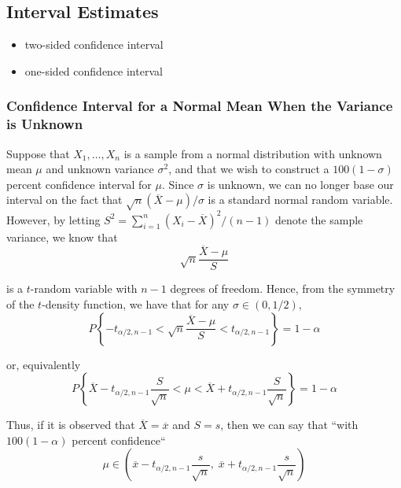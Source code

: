 \documentclass[12pt]{article}
\begin{document}
\subsection{Interval Estimates}

\begin{itemize}
  \item two-sided confidence interval
  \item one-sided confidence interval
\end{itemize}

\subsubsection{Confidence Interval for a Normal Mean When the Variance is Unknown}

Suppose that $X_1, \dots, X_n$ is a sample from a normal distribution with unknown mean $\mu$ and unknown variance $\sigma^2$, and that we wish to construct a $100(1 - \sigma)$ percent confidence interval for $\mu$. Since $\sigma$ is unknown, we can no longer base our interval on the fact that $\sqrt{n}(\overline{X} - \mu) / \sigma$ is a standard normal random variable. However, by letting $S^2 = \sum_{i=1}^n (X_i - \overline{X})^2 / (n-1)$ denote the sample variance, we know that
\begin{equation*}
  \sqrt{n} \frac {\overline{X} - \mu}{S}
\end{equation*}

is a $t$-random variable with $n-1$ degrees of freedom. Hence, from the symmetry of the $t$-density function, we have that for any $\sigma \in (0, 1/2)$,
\begin{equation*}
  P \left\{ - t_{\alpha / 2, n-1} < 
    \sqrt{n} \frac {\overline{X} - \mu}{S}
    < t_{\alpha /2, n-1} \right\} = 1 - \alpha
\end{equation*}

or, equivalently
\begin{equation*}
  P \left\{ \overline{X} - t_{\alpha /2, n-1} \frac{S}{\sqrt{n}} < \mu
    < \overline{X} + t_{\alpha /2, n-1} \frac{S}{\sqrt{n}} \right\}
  = 1 - \alpha
\end{equation*}

Thus, if it is observed that $\overline{X} = \overline{x}$ and $S = s$, then we can say that ``with $100(1 - \alpha)$ percent confidence``
\begin{equation*}
  \mu \in \left( \overline{x} - t_{\alpha /2, n-1} \frac{s}{\sqrt{n}}, \;
    \overline{x} + t_{\alpha /2, n-1} \frac{s}{\sqrt{n}} \right)
\end{equation*}
\end{document}
